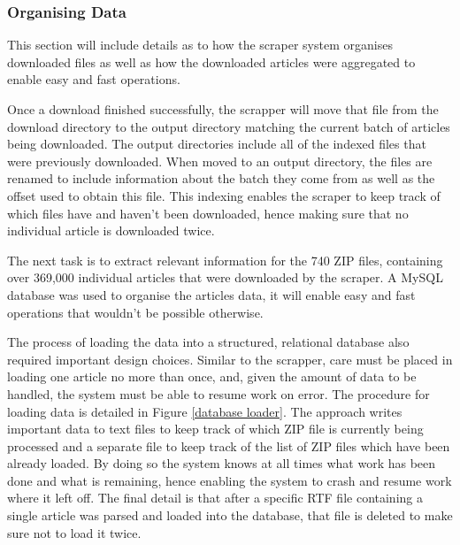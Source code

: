 \subsubsection{Organising Data}

This section will include details as to how the scraper system organises downloaded files as well as how the downloaded articles were aggregated to enable easy and fast operations.

Once a download finished successfully, the scrapper will move that file from the download directory to the output directory matching the current batch of articles being downloaded. The output directories include all of the indexed files that were previously downloaded. When moved to an output directory, the files are renamed to include information about the batch they come from as well as the offset used to obtain this file. This indexing enables the scraper to keep track of which files have and haven't been downloaded, hence making sure that no individual article is downloaded twice.

The next task is to extract relevant information for the 740 ZIP files, containing over 369,000 individual articles that were downloaded by the scraper. A MySQL database was used to organise the articles data, it will enable easy and fast operations that wouldn't be possible otherwise.

The process of loading the data into a structured, relational database also required important design choices. Similar to the scrapper, care must be placed in loading one article no more than once, and, given the amount of data to be handled, the system must be able to resume work on error. The procedure for loading data is detailed in Figure \ref{database loader}. The approach writes important data to text files to keep track of which ZIP file is currently being processed and a separate file to keep track of the list of ZIP files which have been already loaded. By doing so the system knows at all times what work has been done and what is remaining, hence enabling the system to crash and resume work where it left off. The final detail is that after a specific RTF file containing a single article was parsed and loaded into the database, that file is deleted to make sure not to load it twice.

